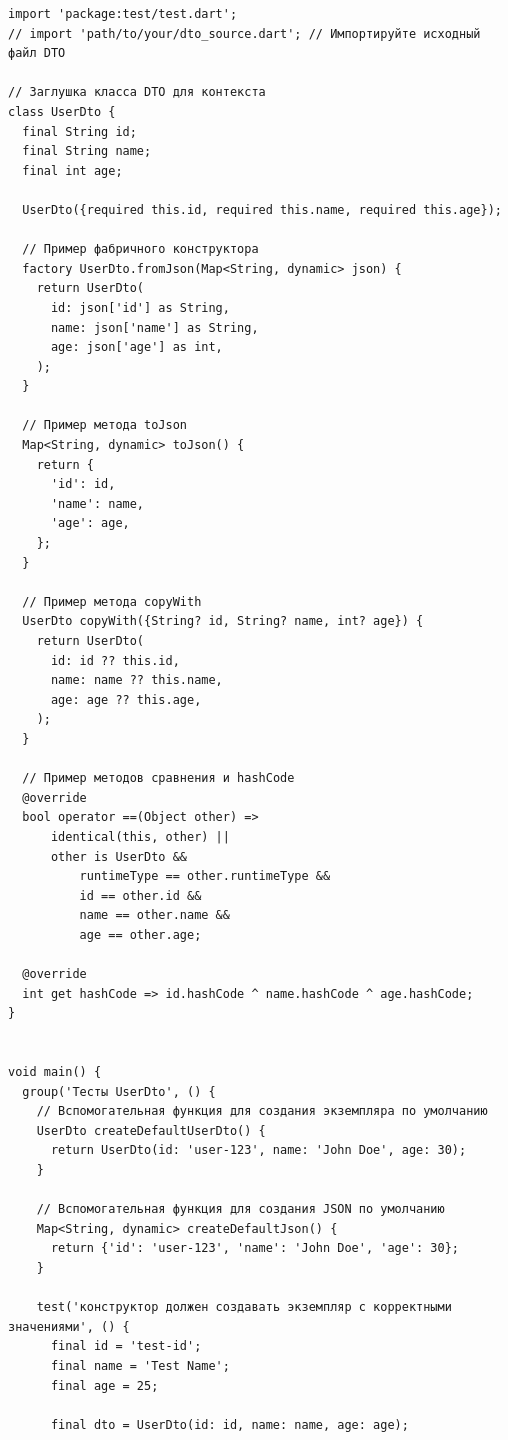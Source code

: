 \documentclass[14pt, russian]{scrartcl}
\begin{document}
\caption{Пример сгенерированного теста для DTO (Dart)}
\hspace*{-10pt}\label{lst:dto_test_example}
\begin{verbatim}
import 'package:test/test.dart';
// import 'path/to/your/dto_source.dart'; // Импортируйте исходный файл DTO

// Заглушка класса DTO для контекста
class UserDto {
  final String id;
  final String name;
  final int age;

  UserDto({required this.id, required this.name, required this.age});

  // Пример фабричного конструктора
  factory UserDto.fromJson(Map<String, dynamic> json) {
    return UserDto(
      id: json['id'] as String,
      name: json['name'] as String,
      age: json['age'] as int,
    );
  }

  // Пример метода toJson
  Map<String, dynamic> toJson() {
    return {
      'id': id,
      'name': name,
      'age': age,
    };
  }

  // Пример метода copyWith
  UserDto copyWith({String? id, String? name, int? age}) {
    return UserDto(
      id: id ?? this.id,
      name: name ?? this.name,
      age: age ?? this.age,
    );
  }

  // Пример методов сравнения и hashCode
  @override
  bool operator ==(Object other) =>
      identical(this, other) ||
      other is UserDto &&
          runtimeType == other.runtimeType &&
          id == other.id &&
          name == other.name &&
          age == other.age;

  @override
  int get hashCode => id.hashCode ^ name.hashCode ^ age.hashCode;
}


void main() {
  group('Тесты UserDto', () {
    // Вспомогательная функция для создания экземпляра по умолчанию
    UserDto createDefaultUserDto() {
      return UserDto(id: 'user-123', name: 'John Doe', age: 30);
    }

    // Вспомогательная функция для создания JSON по умолчанию
    Map<String, dynamic> createDefaultJson() {
      return {'id': 'user-123', 'name': 'John Doe', 'age': 30};
    }

    test('конструктор должен создавать экземпляр с корректными значениями', () {
      final id = 'test-id';
      final name = 'Test Name';
      final age = 25;

      final dto = UserDto(id: id, name: name, age: age);


\end{verbatim}
\end{document}
